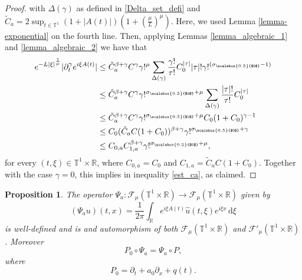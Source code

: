 \documentclass[11pt,reqno]{amsart}
\numberwithin{equation}{section}
\newtheorem{prop}[theorem]{Proposition}
\theoremstyle{definition}
\theoremstyle{definition}
\newcommand{\T}{\mathbb{T}}
\newcommand{\R}{\mathbb{R}}
\newcommand{\g}{\mathbb{T}^1\times\mathbb{R}}
\newcommand{\Smu}{\mathscr{F}_{\mu}(\T^1\times\R)}
\newcommand{\SSmu}{\mathscr{F}'_{\mu}(\T^1\times\R)}
\newcommand{\sigmac}{\sigma_{\scalebox{0.5}{$0$}}}
\begin{document}
\begin{proof}
    with $\Delta(\gamma)$ as defined in \eqref{Delta_set_defi} and $\tilde{C}_a=2\displaystyle\sup_{t\in\T^1}(1+|A(t)|)\left(1+\left(\frac{\mu}{L}\right)^{\mu}\right)$. Here, we used Lemma \ref{lemma-exponential} on the fourth line. Then, applying Lemmas \ref{lemma_algebraic_1} and \ref{lemma_algebraic_2} we have that
    \begin{align*}
         e^{-L|\xi|^{\frac{1}{\mu}}}|\partial_t^\gamma e^{i\xi A(t)}|&\leq \tilde{C}_a^{\beta+\gamma}C^{\gamma}\gamma!^{\mu}\sum_{\Delta(\gamma)}\frac{\gamma!}{\tau!}C_0^{|\tau|}|\tau|!\gamma!^{({\sigmac}-1)}\\
        &\leq \tilde{C}_a^{\beta+\gamma}C^{\gamma}\gamma!^{{\sigmac}+\mu}\sum_{\Delta(\gamma)}\frac{|\tau|!}{\tau!}C_0^{|\tau|}\\
        &\leq \tilde{C}_a^{\beta+\gamma}C^{\gamma}\gamma!^{{\sigmac}+\mu} C_0(1+C_0)^{\gamma-1}\\
        & \leq C_0(\tilde{C}_aC(1+C_0))^{\beta+\gamma}\gamma!^{{\sigmac}+\gamma}\\
        & \leq  C_{0,a}C_{1,a}^{\beta+\gamma}\gamma!^{{\sigmac}+\mu},
    \end{align*}
    for every $(t,\xi)\in\T^1\times\R$, where $C_{0,a}=C_0$ and $C_{1,a}=\tilde{C}_aC(1+C_0)$. Together with the case $\gamma=0$, this implies in inequality \eqref{est_ca}, as claimed.
\end{proof}
\begin{prop}
    The operator $\Psi_a:\mathscr{F}_\mu(\g)\to \mathscr{F}_\mu(\g)$ given by
    \[ (\Psi_a u)(t,x) = \frac{1}{2\pi}\int_{\R} e^{i\xi A(t)}\widehat{u}(t,\xi)e^{i\xi x}\,\mathrm{d}\xi  \]
    is well-defined and is and automorphism of both $\Smu$ and $\SSmu$. Moreover
    \[P_0\circ\Psi_a = \Psi_a\circ P,\]
    where
    \begin{equation}\label{P0} 
    P_0 = \partial_t + a_0\partial_x + q(t).
    \end{equation}
\end{prop}
\end{document}
